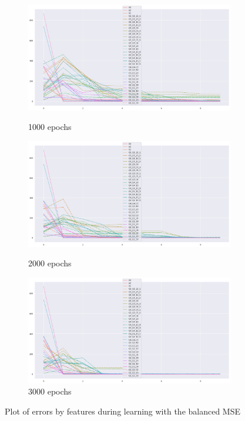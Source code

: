 \documentclass{article}
\theoremstyle{definition}
\begin{document}
\begin{figure}[H]
     \centering
     \begin{subfigure}[b]{0.49\textwidth}
         \centering
         \includegraphics[width=\textwidth]{imgs/Illu/1000Epochs/Imb/SAM_covariates_graph.png}
         \caption{1000 epochs}
         \quad
         \includegraphics[width=\textwidth]{imgs/Illu/2000Epochs/Imb/SAM_covariates_graph.png}
         \caption{2000 epochs}
         \quad
         \includegraphics[width=\textwidth]{imgs/Illu/3000Epochs/Imb/SAM_covariates_graph.png}
         \caption{3000 epochs}
     \end{subfigure}
     \caption{Plot of errors by features during learning with the balanced MSE}    
\end{figure}
\end{document}
